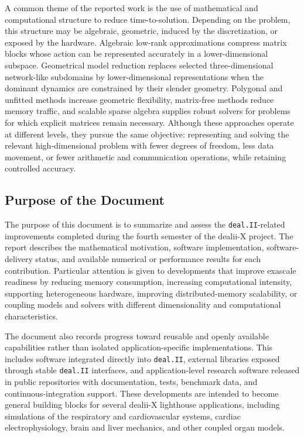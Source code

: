 \documentclass[a4paper,12pt]{article}
\begin{document}
A common theme of the reported work is the use of mathematical and computational structure to reduce time-to-solution. Depending on the problem, this structure may be algebraic, geometric, induced by the discretization, or exposed by the hardware. Algebraic low-rank approximations compress matrix blocks whose action can be represented accurately in a lower-dimensional subspace. Geometrical model reduction replaces selected three-dimensional network-like subdomains by lower-dimensional representations when the dominant dynamics are constrained by their slender geometry. Polygonal and unfitted methods increase geometric flexibility, matrix-free methods reduce memory traffic, and scalable sparse algebra supplies robust solvers for problems for which explicit matrices remain necessary. Although these approaches operate at different levels, they pursue the same objective: representing and solving the relevant high-dimensional problem with fewer degrees of freedom, less data movement, or fewer arithmetic and communication operations, while retaining controlled accuracy.

\subsection{Purpose of the Document}

The purpose of this document is to summarize and assess the \texttt{deal.II}-related improvements completed during the fourth semester of the dealii-X project. The report describes the mathematical motivation, software implementation, software-delivery status, and available numerical or performance results for each contribution. Particular attention is given to developments that improve exascale readiness by reducing memory consumption, increasing computational intensity, supporting heterogeneous hardware, improving distributed-memory scalability, or coupling models and solvers with different dimensionality and computational characteristics.

The document also records progress toward reusable and openly available capabilities rather than isolated application-specific implementations. This includes software integrated directly into \texttt{deal.II}, external libraries exposed through stable \texttt{deal.II} interfaces, and application-level research software released in public repositories with documentation, tests, benchmark data, and continuous-integration support. These developments are intended to become general building blocks for several dealii-X lighthouse applications, including simulations of the respiratory and cardiovascular systems, cardiac electrophysiology, brain and liver mechanics, and other coupled organ models.
\end{document}
